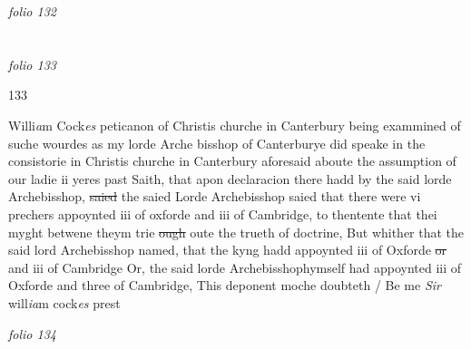 \documentclass[12pt, a4paper]{book}
\begin{document}
\dotfill
					

\textit{folio 132}


         \vspace{4cm}
         
\dotfill
					  \section*{}  \subsection*{}

\textit{folio 133}



\begin{flushright}{\color{Mahogany}133}\end{flushright}

		\ifthenelse{\isodd{\thepage}}
		{\reversemarginpar}
		{\normalmarginpar}
		Willi\textit{a}m Cock\textit{es} peticanon of Christis churche
	in Canterbury being exammined of suche wourdes as
	my lorde Arche bisshop of Canterburye did speake
	in the consistorie in Christis churche in Canterbury
 aforesaid aboute the assumption
			 of our ladie ii yeres past
			 Saith, that apon declaracion
	there hadd by the said lorde Archebisshop, \sout{saied}
	the saied Lorde Archebisshop saied that there
	were vi prechers appoynted iii of oxforde and
	iii of Cambridge, to thentente that thei myght
 betwene theym trie \sout{ough} oute the trueth of
 doctrine, But whither that the said lord
 Archebisshop named, that the kyng hadd
	appoynted iii of Oxforde \sout{or} and
			 iii of Cambridge
	Or, the said lorde Archebisshophymself had
	appoynted iii of Oxforde and three of
 Cambridge, This deponent moche
	doubteth / Be me \textit{Sir} will\textit{ia}m cock\textit{es} prest

\dotfill
					

\textit{folio 134}


         \vspace{4cm}
         
\end{document}
